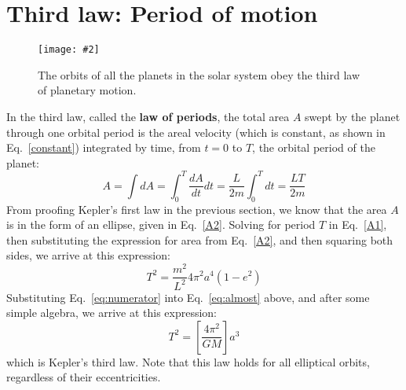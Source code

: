 \documentclass[11pt]{article}
\newcommand{\pic}[2]{
  \texttt{[image: \#2]}
}
\begin{document}
\section{Third law: Period of motion}
\begin{figure}[!ht]
  \centering
  \pic{.55}{../kep8.png}
  \caption{The orbits of all the planets in the solar system obey the third
  law of planetary motion.}
  \label{3rdlaw}
\end{figure}
In the third law, called the \textbf{law of periods}, the total area $A$
swept by the planet through one orbital period is the areal velocity (which is
constant, as shown in Eq.\ \ref{constant}) integrated by time, from $t=0$ to
$T$, the orbital period of the planet:
\begin{equation}
  A=\int dA=\int_0^T\frac{dA}{dt}dt=\frac{L}{2m}\int_0^Tdt=\frac{LT}{2m}
  \label{A1}
\end{equation}
From proofing Kepler's first law in the previous section, we know that the
area $A$ is in the form of an ellipse, given in Eq.~\ref{A2}. Solving for
period $T$ in Eq.~\ref{A1}, then substituting the expression for area from
Eq.~\ref{A2}, and then squaring both sides, we arrive at this expression:
\begin{equation}
  T^2=\frac{m^2}{L^2}4\pi^2a^4(1-e^2)
  \label{eq:almost}
\end{equation}
Substituting Eq.~\ref{eq:numerator}
into Eq.\ \ref{eq:almost} above, and after some simple algebra, we arrive at
this expression:
\begin{equation}
  \boxed{T^2=\left[\frac{4\pi^2}{GM}\right] a^3}
\end{equation}
which is Kepler's third law. Note that this law holds for all elliptical
orbits, regardless of their eccentricities.
\end{document}
